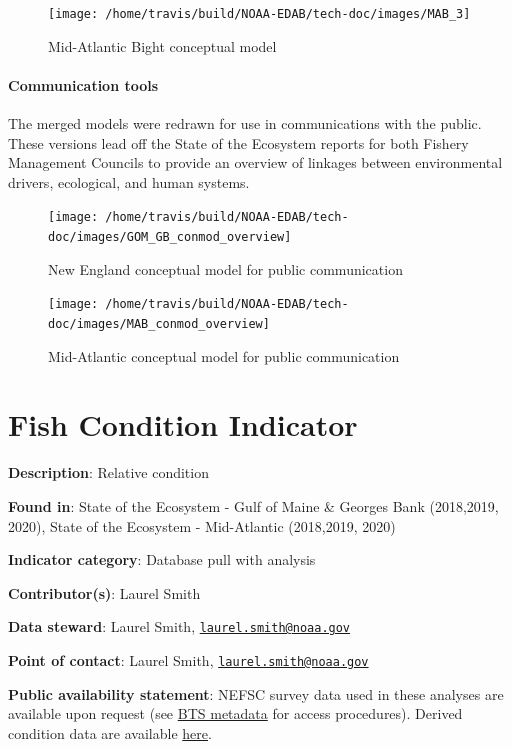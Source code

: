 \documentclass[
]{book}
\begin{document}
\begin{figure}
\texttt{[image: /home/travis/build/NOAA-EDAB/tech-doc/images/MAB\_3]} \caption{Mid-Atlantic Bight conceptual model}\label{fig:diaMAB}
\end{figure}

\hypertarget{communication-tools}{%
\subsubsection{Communication tools}\label{communication-tools}}

The merged models were redrawn for use in communications with the public. These versions lead off the State of the Ecosystem reports for both Fishery Management Councils to provide an overview of linkages between environmental drivers, ecological, and human systems.

\begin{figure}
\texttt{[image: /home/travis/build/NOAA-EDAB/tech-doc/images/GOM\_GB\_conmod\_overview]} \caption{New England conceptual model for public communication}\label{fig:prettyNE}
\end{figure}

\begin{figure}
\texttt{[image: /home/travis/build/NOAA-EDAB/tech-doc/images/MAB\_conmod\_overview]} \caption{Mid-Atlantic conceptual model for public communication}\label{fig:prettyMA}
\end{figure}

\hypertarget{fish-condition-indicator}{%
\chapter{Fish Condition Indicator}\label{fish-condition-indicator}}

\textbf{Description}: Relative condition

\textbf{Found in}: State of the Ecosystem - Gulf of Maine \& Georges Bank (2018,2019, 2020), State of the Ecosystem - Mid-Atlantic (2018,2019, 2020)

\textbf{Indicator category}: Database pull with analysis

\textbf{Contributor(s)}: Laurel Smith

\textbf{Data steward}: Laurel Smith, \href{mailto:laurel.smith@noaa.gov}{\nolinkurl{laurel.smith@noaa.gov}}

\textbf{Point of contact}: Laurel Smith, \href{mailto:laurel.smith@noaa.gov}{\nolinkurl{laurel.smith@noaa.gov}}

\textbf{Public availability statement}: NEFSC survey data used in these analyses are available upon request (see \href{https://inport.nmfs.noaa.gov/inport/item/22560}{BTS metadata} for access procedures). Derived condition data are available \href{https://comet.nefsc.noaa.gov/erddap/tabledap/gf_condition_soe_v1.html}{here}.
\end{document}
